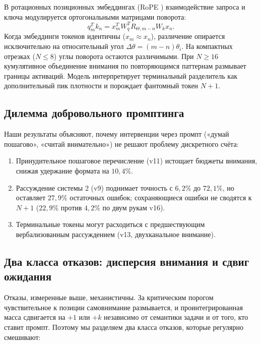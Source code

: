 \documentclass[11pt,a4paper]{article}
\begin{document}
В ротационных позиционных эмбеддингах (RoPE \cite{su2024roformer}) взаимодействие запроса и ключа модулируется ортогональными матрицами поворота:
\begin{equation}
    q_m^T k_n = x_m^T W_q^T R_{\Theta, m-n} W_k x_n.
\end{equation}
Когда эмбеддинги токенов идентичны ($x_m \approx x_n$), различение опирается исключительно на относительный угол $\Delta \theta = (m - n)\theta_i$. На компактных отрезках ($N \le 8$) углы поворота остаются различимыми. При $N \ge 16$ кумулятивное объединение внимания по повторяющимся паттернам размывает границы активаций. Модель интерпретирует терминальный разделитель как дополнительный пик плотности и порождает фантомный токен $N+1$.

\subsection{Дилемма добровольного промптинга}
Наши результаты объясняют, почему интервенции через промпт («думай пошагово», «считай внимательно») не решают проблему дискретного счёта:
\begin{enumerate}
    \item Принудительное пошаговое перечисление (v11) истощает бюджеты внимания, снижая удержание формата на $10{,}4\%$.
    \item Рассуждение системы 2 (v9) поднимает точность с $6{,}2\%$ до $72{,}1\%$, но оставляет $27{,}9\%$ остаточных ошибок; сохраняющиеся ошибки не сводятся к $N+1$ ($22{,}9\%$ против $4{,}2\%$ по двум рукам v16).
    \item Терминальные токены могут расходиться с предшествующим вербализованным рассуждением (v13, двухканальное внимание).
\end{enumerate}

\subsection{Два класса отказов: дисперсия внимания и сдвиг ожидания}
\label{sec:twofailures}

Отказы, измеренные выше, механистичны. За критическим порогом чувствительное к позиции самовнимание размывается, и проинтегрированная масса сдвигается на $+1$ или $+k$ независимо от семантики задачи и от того, кто ставит промпт. Поэтому мы разделяем два класса отказов, которые регулярно смешивают:
\end{document}
